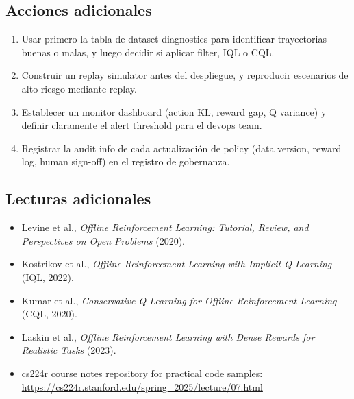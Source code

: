 \subsection{Acciones adicionales}

\begin{enumerate}
    \item Usar primero la tabla de dataset diagnostics para identificar trayectorias buenas o malas, y luego decidir si aplicar filter, IQL o CQL.
    \item Construir un replay simulator antes del despliegue, y reproducir escenarios de alto riesgo mediante replay.
    \item Establecer un monitor dashboard (action KL, reward gap, Q variance) y definir claramente el alert threshold para el devops team.
    \item Registrar la audit info de cada actualización de policy (data version, reward log, human sign-off) en el registro de gobernanza.
\end{enumerate}

\subsection{Lecturas adicionales}
\begin{itemize}
    \item Levine et al., \textit{Offline Reinforcement Learning: Tutorial, Review, and Perspectives on Open Problems} (2020).
    \item Kostrikov et al., \textit{Offline Reinforcement Learning with Implicit Q-Learning} (IQL, 2022).
    \item Kumar et al., \textit{Conservative Q-Learning for Offline Reinforcement Learning} (CQL, 2020).
    \item Laskin et al., \textit{Offline Reinforcement Learning with Dense Rewards for Realistic Tasks} (2023).
    \item cs224r course notes repository for practical code samples: \url{https://cs224r.stanford.edu/spring_2025/lecture/07.html}
\end{itemize}


